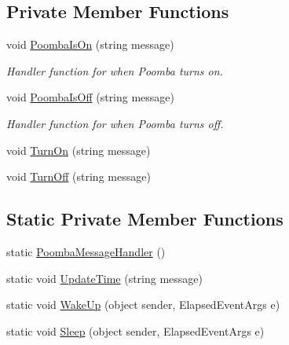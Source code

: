 \subsection*{Private Member Functions}
\begin{DoxyCompactItemize}
\item 
void \mbox{\hyperlink{class_master_application_1_1_message_handlers_1_1_poomba_message_handler_a934ed11f001a917e3ed9d0e61eab542e}{Poomba\+Is\+On}} (string message)
\begin{DoxyCompactList}\small\item\em Handler function for when Poomba turns on. \end{DoxyCompactList}\item 
void \mbox{\hyperlink{class_master_application_1_1_message_handlers_1_1_poomba_message_handler_af70c8de253c60c1f125e6715487de921}{Poomba\+Is\+Off}} (string message)
\begin{DoxyCompactList}\small\item\em Handler function for when Poomba turns off. \end{DoxyCompactList}\item 
void \mbox{\hyperlink{class_master_application_1_1_message_handlers_1_1_poomba_message_handler_a6e4ba259c1d9074f4e3508c6010c028a}{Turn\+On}} (string message)
\item 
void \mbox{\hyperlink{class_master_application_1_1_message_handlers_1_1_poomba_message_handler_a1cfd1a817648573e03ef02e0499e56f9}{Turn\+Off}} (string message)
\end{DoxyCompactItemize}
\subsection*{Static Private Member Functions}
\begin{DoxyCompactItemize}
\item 
static \mbox{\hyperlink{class_master_application_1_1_message_handlers_1_1_poomba_message_handler_a79b0fb9c31b4e159e84f4f5fc6c4230e}{Poomba\+Message\+Handler}} ()
\item 
static void \mbox{\hyperlink{class_master_application_1_1_message_handlers_1_1_poomba_message_handler_acedd70fc2d2f6cd2aef52853b0008762}{Update\+Time}} (string message)
\item 
static void \mbox{\hyperlink{class_master_application_1_1_message_handlers_1_1_poomba_message_handler_a64a87ea54159ec8141884cf0ca6cf3be}{Wake\+Up}} (object sender, Elapsed\+Event\+Args e)
\item 
static void \mbox{\hyperlink{class_master_application_1_1_message_handlers_1_1_poomba_message_handler_ab557dca7cd4a20b44b9db8d1c78f65ed}{Sleep}} (object sender, Elapsed\+Event\+Args e)
\end{DoxyCompactItemize}
